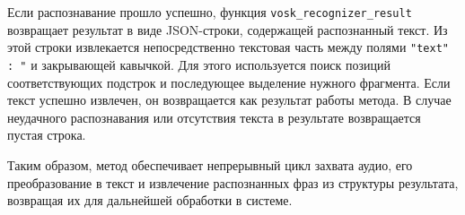 Если распознавание прошло успешно, функция \texttt{vosk\_recognizer\_result} возвращает результат в виде JSON-строки, содержащей распознанный текст. Из этой строки извлекается непосредственно текстовая часть между полями \texttt{\string"text\string" : \string"} и закрывающей кавычкой. Для этого используется поиск позиций соответствующих подстрок и последующее выделение нужного фрагмента. Если текст успешно извлечен, он возвращается как результат работы метода. В случае неудачного распознавания или отсутствия текста в результате возвращается пустая строка.

Таким образом, метод обеспечивает непрерывный цикл захвата аудио, его преобразование в текст и извлечение распознанных фраз из структуры результата, возвращая их для дальнейшей обработки в системе.

\newpage

